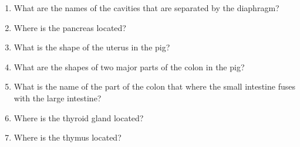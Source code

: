 \documentclass[]{article}
\providecommand{\tightlist}{%
  \setlength{\itemsep}{0pt}\setlength{\parskip}{0pt}}
\providecommand{\tightlist}{%
  \setlength{\itemsep}{0pt}\setlength{\parskip}{0pt}}
\theoremstyle{definition}
\theoremstyle{definition}
\theoremstyle{definition}
\theoremstyle{remark}
\begin{document}
\begin{enumerate}
\def\labelenumi{\arabic{enumi}.}
\tightlist
\item
  What are the names of the cavities that are separated by the diaphragm?
\item
  Where is the pancreas located?
\item
  What is the shape of the uterus in the pig?
\item
  What are the shapes of two major parts of the colon in the pig?
\item
  What is the name of the part of the colon that where the small intestine fuses with the large intestine?
\item
  Where is the thyroid gland located?
\item
  Where is the thymus located?
\end{enumerate}
\end{document}
